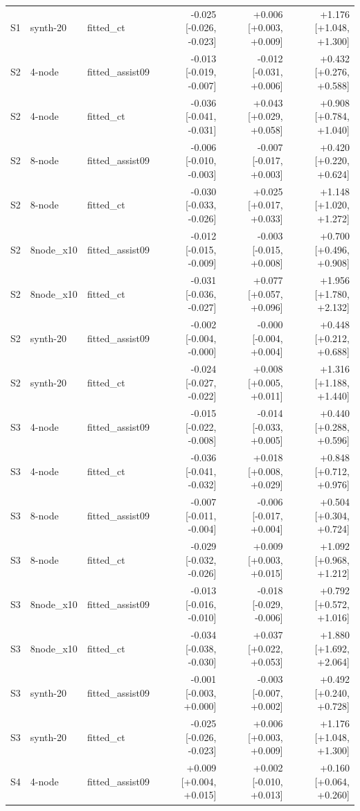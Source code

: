 \begin{table}[htbp]
\begin{tabular}{lllrrr}
S1 & synth-20 & fitted\_ct & -0.025 [-0.026, -0.023] & +0.006 [+0.003, +0.009] & +1.176 [+1.048, +1.300] \\
S2 & 4-node & fitted\_assist09 & -0.013 [-0.019, -0.007] & -0.012 [-0.031, +0.006] & +0.432 [+0.276, +0.588] \\
S2 & 4-node & fitted\_ct & -0.036 [-0.041, -0.031] & +0.043 [+0.029, +0.058] & +0.908 [+0.784, +1.040] \\
S2 & 8-node & fitted\_assist09 & -0.006 [-0.010, -0.003] & -0.007 [-0.017, +0.003] & +0.420 [+0.220, +0.624] \\
S2 & 8-node & fitted\_ct & -0.030 [-0.033, -0.026] & +0.025 [+0.017, +0.033] & +1.148 [+1.020, +1.272] \\
S2 & 8node\_x10 & fitted\_assist09 & -0.012 [-0.015, -0.009] & -0.003 [-0.015, +0.008] & +0.700 [+0.496, +0.908] \\
S2 & 8node\_x10 & fitted\_ct & -0.031 [-0.036, -0.027] & +0.077 [+0.057, +0.096] & +1.956 [+1.780, +2.132] \\
S2 & synth-20 & fitted\_assist09 & -0.002 [-0.004, -0.000] & -0.000 [-0.004, +0.004] & +0.448 [+0.212, +0.688] \\
S2 & synth-20 & fitted\_ct & -0.024 [-0.027, -0.022] & +0.008 [+0.005, +0.011] & +1.316 [+1.188, +1.440] \\
S3 & 4-node & fitted\_assist09 & -0.015 [-0.022, -0.008] & -0.014 [-0.033, +0.005] & +0.440 [+0.288, +0.596] \\
S3 & 4-node & fitted\_ct & -0.036 [-0.041, -0.032] & +0.018 [+0.008, +0.029] & +0.848 [+0.712, +0.976] \\
S3 & 8-node & fitted\_assist09 & -0.007 [-0.011, -0.004] & -0.006 [-0.017, +0.004] & +0.504 [+0.304, +0.724] \\
S3 & 8-node & fitted\_ct & -0.029 [-0.032, -0.026] & +0.009 [+0.003, +0.015] & +1.092 [+0.968, +1.212] \\
S3 & 8node\_x10 & fitted\_assist09 & -0.013 [-0.016, -0.010] & -0.018 [-0.029, -0.006] & +0.792 [+0.572, +1.016] \\
S3 & 8node\_x10 & fitted\_ct & -0.034 [-0.038, -0.030] & +0.037 [+0.022, +0.053] & +1.880 [+1.692, +2.064] \\
S3 & synth-20 & fitted\_assist09 & -0.001 [-0.003, +0.000] & -0.003 [-0.007, +0.002] & +0.492 [+0.240, +0.728] \\
S3 & synth-20 & fitted\_ct & -0.025 [-0.026, -0.023] & +0.006 [+0.003, +0.009] & +1.176 [+1.048, +1.300] \\
S4 & 4-node & fitted\_assist09 & +0.009 [+0.004, +0.015] & +0.002 [-0.010, +0.013] & +0.160 [+0.064, +0.260] \\

\end{tabular}
\end{table}
